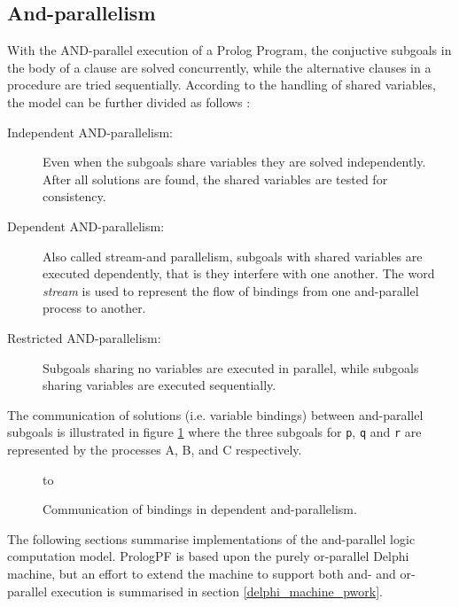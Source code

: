 \subsection{And-parallelism}


With the AND-parallel execution of a Prolog Program, the conjuctive subgoals in the
body of a clause are solved concurrently, while the alternative clauses in a
procedure are tried sequentially. According to the handling of shared variables,
the model can be further divided as follows \cite{CK81}:
\begin{description}
\item[Independent AND-parallelism:]{ Even when the subgoals share variables
  they are solved independently.  After all solutions are found, the shared
  variables are tested for consistency.}
\item[Dependent AND-parallelism:]{ Also called stream-and parallelism, subgoals
  with shared variables are executed dependently, that is they interfere with
  one another.  The word \textit{stream} is used to represent the flow of bindings
  from one and-parallel process to another.}
\item[Restricted AND-parallelism:]{ Subgoals sharing no variables are executed in
  parallel, while subgoals sharing variables are executed sequentially.}
\end{description}

The communication of solutions (i.e. variable bindings) between and-parallel
subgoals is illustrated in figure \ref{stream} where the three subgoals for
\texttt{p}, \texttt{q} and \texttt{r} are
represented by the processes A, B, and C respectively.

\begin{figure}[h]
\vspace{5mm} \hbox to 
\caption{Communication of bindings in dependent and-parallelism.}
\vspace{5mm}
\label{stream}
\end{figure}

The following sections summarise implementations of the and-parallel logic computation
model.  PrologPF is based upon the purely or-parallel Delphi machine, but an effort
to extend the machine to support both and- and or-parallel execution \cite{Wre90}
is summarised in section \ref{delphi_machine_pwork}.


